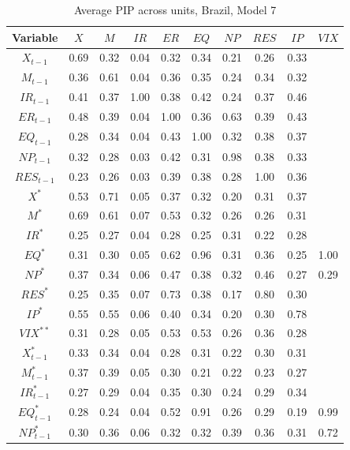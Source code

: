 \documentclass[a4paper, twoside]{templates/ociamthesis}
\begin{document}
\clearpage

\begin{table}[!ht]

\caption{\label{tab:Table55BR7}Average PIP across units, Brazil, Model 7}
\centering
\fontsize{6}{8}\selectfont
\begin{tabular}[t]{cccccccccc}
\toprule
Variable & $X$ & $M$ & $IR$ & $ER$ & $EQ$ & $NP$ & $RES$ & $IP$ & $VIX$\\
\midrule
$X_{t-1}$ & 0.69 & 0.32 & 0.04 & 0.32 & 0.34 & 0.21 & 0.26 & 0.33 & \\
$M_{t-1}$ & 0.36 & 0.61 & 0.04 & 0.36 & 0.35 & 0.24 & 0.34 & 0.32 & \\
$IR_{t-1}$ & 0.41 & 0.37 & 1.00 & 0.38 & 0.42 & 0.24 & 0.37 & 0.46 & \\
$ER_{t-1}$ & 0.48 & 0.39 & 0.04 & 1.00 & 0.36 & 0.63 & 0.39 & 0.43 & \\
$EQ_{t-1}$ & 0.28 & 0.34 & 0.04 & 0.43 & 1.00 & 0.32 & 0.38 & 0.37 & \\
$NP_{t-1}$ & 0.32 & 0.28 & 0.03 & 0.42 & 0.31 & 0.98 & 0.38 & 0.33 & \\
$RES_{t-1}$ & 0.23 & 0.26 & 0.03 & 0.39 & 0.38 & 0.28 & 1.00 & 0.36 & \\
$X^*$ & 0.53 & 0.71 & 0.05 & 0.37 & 0.32 & 0.20 & 0.31 & 0.37 & \\
$M^*$ & 0.69 & 0.61 & 0.07 & 0.53 & 0.32 & 0.26 & 0.26 & 0.31 & \\
$IR^*$ & 0.25 & 0.27 & 0.04 & 0.28 & 0.25 & 0.31 & 0.22 & 0.28 & \\
$EQ^*$ & 0.31 & 0.30 & 0.05 & 0.62 & 0.96 & 0.31 & 0.36 & 0.25 & 1.00\\
$NP^*$ & 0.37 & 0.34 & 0.06 & 0.47 & 0.38 & 0.32 & 0.46 & 0.27 & 0.29\\
$RES^*$ & 0.25 & 0.35 & 0.07 & 0.73 & 0.38 & 0.17 & 0.80 & 0.30 & \\
$IP^*$ & 0.55 & 0.55 & 0.06 & 0.40 & 0.34 & 0.20 & 0.30 & 0.78 & \\
$VIX^{**}$ & 0.31 & 0.28 & 0.05 & 0.53 & 0.53 & 0.26 & 0.36 & 0.28 & \\
$X^*_{t-1}$ & 0.33 & 0.34 & 0.04 & 0.28 & 0.31 & 0.22 & 0.30 & 0.31 & \\
$M^*_{t-1}$ & 0.37 & 0.39 & 0.05 & 0.30 & 0.21 & 0.22 & 0.23 & 0.27 & \\
$IR^*_{t-1}$ & 0.27 & 0.29 & 0.04 & 0.35 & 0.30 & 0.24 & 0.29 & 0.34 & \\
$EQ^*_{t-1}$ & 0.28 & 0.24 & 0.04 & 0.52 & 0.91 & 0.26 & 0.29 & 0.19 & 0.99\\
$NP^*_{t-1}$ & 0.30 & 0.36 & 0.06 & 0.32 & 0.32 & 0.39 & 0.36 & 0.31 & 0.72\\

\end{tabular}
\end{table}
\end{document}
